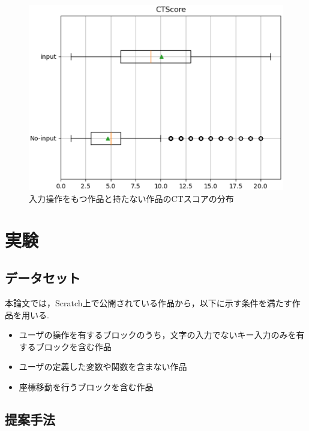 \documentclass[uplatex,dvipdfmx,a4paper,twocolumn,base=11pt,jbase=11pt,ja=standard]{bxjsarticle}  %
\begin{document}
\begin{figure}
    \begin{center}
        \includegraphics[width=0.9\linewidth]{plot.eps}
        \caption{入力操作をもつ作品と持たない作品のCTスコアの分布}
        \label{fig:test}
    \end{center}
\vspace{-10mm}
\end{figure}

\section{実験}

\subsection{データセット}

本論文では，Scratch上で公開されている作品から，以下に示す条件を満たす作品を用いる.
\begin{itemize}
 \item ユーザの操作を有するブロックのうち，文字の入力でないキー入力のみを有するブロックを含む作品
 \item ユーザの定義した変数や関数を含まない作品
 \item 座標移動を行うブロックを含む作品
\end{itemize}

\subsection{提案手法}
\end{document}
